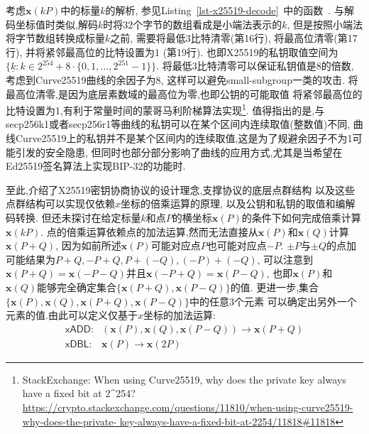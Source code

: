 考虑$\mathbf{x}(kP)$中的标量$k$的解析,
参见Listing~\ref{lst-x25519-decode}~中的函数~.
与解码坐标值时类似,解码$k$时将32个字节的数组看成是小端法表示的$k$,
但是按照小端法将字节数组转换成标量$k$之前,
需要将最低3比特清零(第16行), 将最高位清零(第17行), 并将紧邻最高位的比特设置为1 (第19行).
也即X25519的私钥取值空间为$\{\underline{k}: k\in 2^{254} + 8\cdot\{0,1,\ldots,2^{251}-1\}\}$.
将最低3比特清零可以保证私钥值是8的倍数,考虑到Curve25519曲线的余因子为8,
这样可以避免small-subgroup一类的攻击.
将最高位清零,是因为底层素数域的最高位为零,也即公钥的可能取值
将紧邻最高位的比特设置为1,有利于常量时间的蒙哥马利阶梯算法实现\footnote{
StackExchange: When using Curve25519, why does the private key always have a fixed bit at 2\^{}254?
\url{https://crypto.stackexchange.com/questions/11810/when-using-curve25519-why-does-the-private-
key-always-have-a-fixed-bit-at-2254/11818\#11818}}.
值得指出的是,与secp256k1或者secp256r1等曲线的私钥可以在某个区间内连续取值(整数值)不同,
曲线Curve25519上的私钥并不是某个区间内的连续取值,这是为了规避余因子不为1可能引发的安全隐患,
但同时也部分部分影响了曲线的应用方式,尤其是当希望在Ed25519签名算法上实现BIP-32的功能时.

至此,介绍了X25519密钥协商协议的设计理念,支撑协议的底层点群结构
以及这些点群结构可以实现仅依赖$x$坐标的倍乘运算的原理, 以及公钥和私钥的取值和编解码转换.
但还未探讨在给定标量$k$和点$P$的横坐标$\mathbf{x}(P)$的条件下如何完成倍乘计算$\mathbf{x}(kP)$.
点的倍乘运算依赖点的加法运算,然而无法直接从$\mathbf{x}(P)$和$\mathbf{x}(Q)$计算$\mathbf{x}(P+Q)$,
因为如前所述$\mathbf{x}(P)$可能对应点$P$也可能对应点$-P$.
$\pm P$与$\pm Q$的点加可能结果为$P+Q, -P+Q, P+(-Q), (-P)+(-Q)$,
可以注意到$\mathbf{x}(P+Q) = \mathbf{x}(-P-Q)$并且$\mathbf{x}(-P+Q) = \mathbf{x}(P-Q)$,
也即$\mathbf{x}(P)$和$\mathbf{x}(Q)$能够完全确定集合$\{ \mathbf{x}(P+Q), \mathbf{x}(P-Q)\}$的值. 
更进一步,集合$\{ \mathbf{x}(P), \mathbf{x}(Q), \mathbf{x}(P+Q), \mathbf{x}(P-Q) \}$中的任意3个元素
可以确定出另外一个元素的值.由此可以定义仅基于$x$坐标的加法运算:
\begin{equation*}
\begin{array}{cc}
\textsf{xADD}: & (\mathbf{x}(P), \mathbf{x}(Q), \mathbf{x}(P-Q)) \rightarrow \mathbf{x}(P+Q) \\
\textsf{xDBL}: & \mathbf{x}(P) \rightarrow \mathbf{x}(2P)
\end{array}
\end{equation*}

